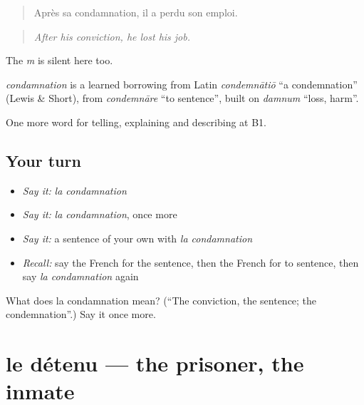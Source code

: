 \begin{quote}
Après sa condamnation, il a perdu son emploi.
\end{quote}

\begin{quote}
\emph{After his conviction, he lost his job.}
\end{quote}

The \emph{m} is silent here too.

\begin{cousinweb}
\emph{condamnation} is a learned borrowing from Latin \emph{condemnātiō} \textquotedblleft{}a condemnation\textquotedblright{} (Lewis \& Short), from \emph{condemnāre} \textquotedblleft{}to sentence\textquotedblright{}, built on \emph{damnum} \textquotedblleft{}loss, harm\textquotedblright{}.
\end{cousinweb}

\begin{grammarlens}[title={What you've built}]
One more word for telling, explaining and describing at B1.
\end{grammarlens}

\subsection*{Your turn}
\begin{itemize}
\raggedright
  \item \emph{Say it:} \emph{la condamnation}
  \item \emph{Say it:} \emph{la condamnation}, once more
  \item \emph{Say it:} a sentence of your own with \emph{la condamnation}
  \item \emph{Recall:} say the French for the sentence, then the French for to sentence, then say \emph{la condamnation} again
\end{itemize}

\begin{tcolorbox}[breakable,colback=teal!4,colframe=teal!35!black,title={Before you move on}]
What does la condamnation mean? (\textquotedblleft{}The conviction, the sentence; the condemnation\textquotedblright{}.) Say it once more.
\end{tcolorbox}
\section[le détenu]{le détenu — the prisoner, the inmate}

\label{lesson:FR-C388-detenu}



